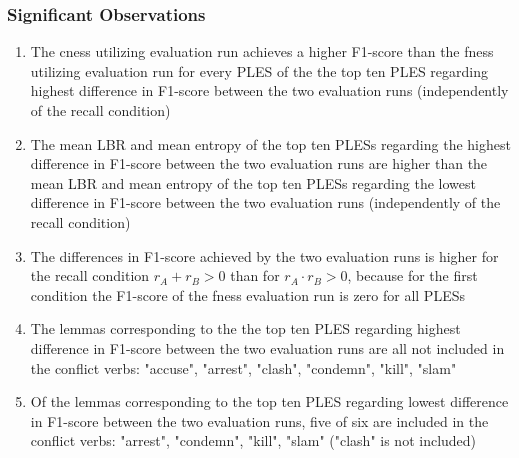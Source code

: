 \documentclass[11pt]{scrreprt}
\newcounter{listcounter}
\begin{document}
{\subsubsection{Significant Observations}
\begin{enumerate}[label=\arabic{listcounter}.\arabic*]
	\item The \gls{cness} utilizing evaluation run achieves a higher F1-score than the \gls{fness} utilizing evaluation run for every PLES of the the top ten PLES regarding highest difference in F1-score between the two evaluation runs (independently of the recall condition) \label{obs-itm:cness-higher-f1-for-highest-f1-difference}
	\item The mean LBR and mean entropy of the top ten PLESs regarding the highest difference in F1-score between the two evaluation runs are higher than the mean LBR and mean entropy of the top ten PLESs regarding the lowest difference in F1-score between the two evaluation runs (independently of the recall condition) \label{obs-itm:PLES-more-diverse-for-highest-f1-difference}
	\item The differences in F1-score achieved by the two evaluation runs is higher for the recall condition \(r_A + r_B > 0\) than for \(r_A \cdot r_B > 0\), because for the first condition the F1-score of the \gls{fness} evaluation run is zero for all PLESs \label{obs-itm:fness-zero-recall-highest-f1-difference}
	\item The lemmas corresponding to the the top ten PLES regarding highest difference in F1-score between the two evaluation runs are all not included in the conflict verbs: "accuse", "arrest", "clash", "condemn", "kill", "slam" \label{obs-itm:conflict-verbs-not-in-highest-f1-difference}
	\item Of the lemmas corresponding to  the top ten PLES regarding lowest difference in F1-score between the two evaluation runs, five of six are included in the conflict verbs: "arrest", "condemn", "kill", "slam" ("clash" is not included) \label{obs-itm:conflict-verbs-in-lowest-f1-difference}



\end{enumerate}}
\end{document}
